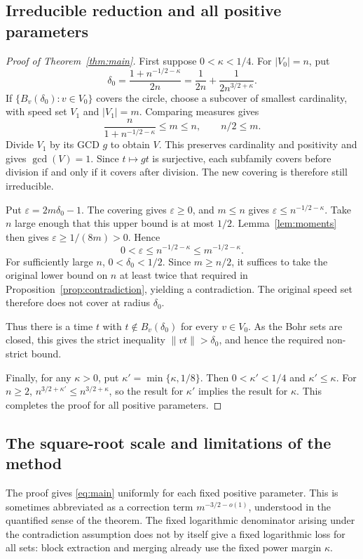 \documentclass[12pt,leqno]{article}
\numberwithin{equation}{section}
\theoremstyle{remark}
\begin{document}
\subsection{Irreducible reduction and all positive parameters}
\begin{proof}[Proof of Theorem~\ref{thm:main}]
First suppose $0<\kappa<1/4$. For $|V_0|=n$, put
\[
\delta_0=\frac{1+n^{-1/2-\kappa}}{2n}
=\frac1{2n}+\frac1{2n^{3/2+\kappa}}.
\]
If $\{B_v(\delta_0):v\in V_0\}$ covers the circle, choose a subcover of smallest cardinality, with speed set $V_1$ and $|V_1|=m$. Comparing measures gives
\[
\frac{n}{1+n^{-1/2-\kappa}}\le m\le n,
\qquad n/2\le m.
\]
Divide $V_1$ by its GCD $g$ to obtain $V$. This preserves cardinality and positivity and gives $\gcd(V)=1$. Since $t\mapsto gt$ is surjective, each subfamily covers before division if and only if it covers after division. The new covering is therefore still irreducible.

Put $\varepsilon=2m\delta_0-1$. The covering gives $\varepsilon\ge0$, and $m\le n$ gives $\varepsilon\le n^{-1/2-\kappa}$. Take $n$ large enough that this upper bound is at most $1/2$. Lemma~\ref{lem:moments} then gives $\varepsilon\ge1/(8m)>0$. Hence
\[
0<\varepsilon\le n^{-1/2-\kappa}\le m^{-1/2-\kappa}.
\]
For sufficiently large $n$, $0<\delta_0<1/2$. Since $m\ge n/2$, it suffices to take the original lower bound on $n$ at least twice that required in Proposition~\ref{prop:contradiction}, yielding a contradiction. The original speed set therefore does not cover at radius $\delta_0$.

Thus there is a time $t$ with $t\notin B_v(\delta_0)$ for every $v\in V_0$. As the Bohr sets are closed, this gives the strict inequality $\|vt\|>\delta_0$, and hence the required non-strict bound.

Finally, for any $\kappa>0$, put $\kappa'=\min\{\kappa,1/8\}$. Then $0<\kappa'<1/4$ and $\kappa'\le\kappa$. For $n\ge2$, $n^{3/2+\kappa'}\le n^{3/2+\kappa}$, so the result for $\kappa'$ implies the result for $\kappa$. This completes the proof for all positive parameters.
\end{proof}

\subsection{The square-root scale and limitations of the method}
The proof gives \eqref{eq:main} uniformly for each fixed positive parameter. This is sometimes abbreviated as a correction term $m^{-3/2-o(1)}$, understood in the quantified sense of the theorem. The fixed logarithmic denominator arising under the contradiction assumption does not by itself give a fixed logarithmic loss for all sets: block extraction and merging already use the fixed power margin $\kappa$.
\end{document}
